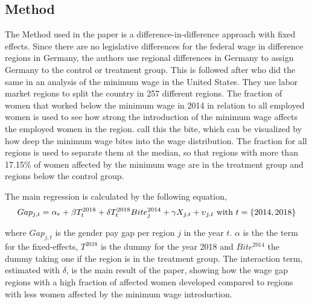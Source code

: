 \documentclass[12pt,draft,a4paper]{article}
\begin{document}
\subsection{Method}


The Method used in the paper is a difference-in-difference approach with fixed effects. 
Since there are no legislative differences for the federal wage in difference regions in Germany, the authors use regional differences in Germany to assign Germany to the control or treatment group.
This is followed after \citet{Card1992} who did the same in an analysis of the minimum wage in the United States. 
They  use labor market regions to split the country in 257 different regions. 
The fraction of women that worked below the minimum wage in 2014 in relation to all employed women is used to see how 
strong %
the introduction of the minimum wage affects the employed women in the region. 
 call this the bite, which can be visualized by how deep the minimum wage bites into the wage distribution.
The fraction for all regions is used to separate them at the median, so that regions with more than 17.15\% of women affected by the minimum wage are in the treatment group and regions below the control group.

The main regression is calculated by the following equation,
\begin{equation}\label{equ:main}
    Gap_{j,t} = \alpha_r + \beta T_{t}^{2018} + \delta T_{t}^{2018} Bite_{j}^{2014} + \gamma X_{j,t} + \upsilon_{j,t} \textnormal{ with } t =\{2014, 2018\} 
\end{equation}

where $Gap_{j,t}$ is the gender pay gap per region $j$ in the year $t$. $ \alpha$ is the the term for the fixed-effects, $T^{2018}$ is the dummy for the year 2018 and $Bite^{2014}$ the dummy taking one if the region is in the treatment group.
The interaction term, estimated with $\delta$, is the main result of the paper, showing how the wage gap regions with a high fraction of affected women developed compared to regions with less women affected by the minimum wage introduction.
\end{document}
